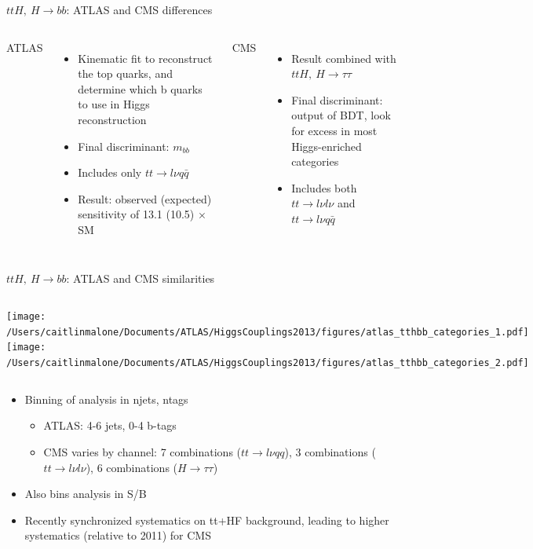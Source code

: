\documentclass{beamer}
\begin{document}
\begin{frame}{$ttH,\ H\rightarrow bb$: ATLAS and CMS differences}
	\begin{columns}
			ATLAS \\
				\begin{itemize} \scriptsize
					\item Kinematic fit to reconstruct the top quarks, and determine which b quarks to use in Higgs reconstruction
					\item Final discriminant: $m_{bb}$
					\item Includes only $tt\rightarrow l\nu q\bar{q}$
					\item Result: observed (expected) sensitivity of 13.1 (10.5) $\times$ SM
				\end{itemize}
			CMS \\
				\begin{itemize} \scriptsize
					\item Result combined with $ttH,\ H\rightarrow\tau\tau$
					\item Final discriminant: output of BDT, look for excess in most Higgs-enriched categories
					\item Includes both $tt\rightarrow l\nu l\nu$ and $tt\rightarrow l\nu q\bar{q}$
				\end{itemize}
	\end{columns}
\end{frame}



\begin{frame}{$ttH,\ H\rightarrow bb$: ATLAS and CMS similarities}
	\begin{columns}[c]
		\column{0.5\textwidth}
			\texttt{[image: /Users/caitlinmalone/Documents/ATLAS/HiggsCouplings2013/figures/atlas\_tthbb\_categories\_1.pdf]}
		\column{0.5\textwidth}
			\texttt{[image: /Users/caitlinmalone/Documents/ATLAS/HiggsCouplings2013/figures/atlas\_tthbb\_categories\_2.pdf]}
	\end{columns}
	\begin{itemize} \scriptsize
		\item Binning of analysis in njets, ntags
			\begin{itemize} \scriptsize
				\item ATLAS: 4-6 jets, 0-4 b-tags
				\item CMS varies by channel: 7 combinations ($tt\rightarrow l\nu qq$), 3 combinations ($tt\rightarrow l\nu l\nu$),  6 combinations ($H\rightarrow \tau\tau$)
			\end{itemize}
		\item Also bins analysis in S/B
		\item Recently synchronized systematics on tt+HF background, leading to higher systematics (relative to 2011) for CMS
	\end{itemize}
\end{frame}
\end{document}
